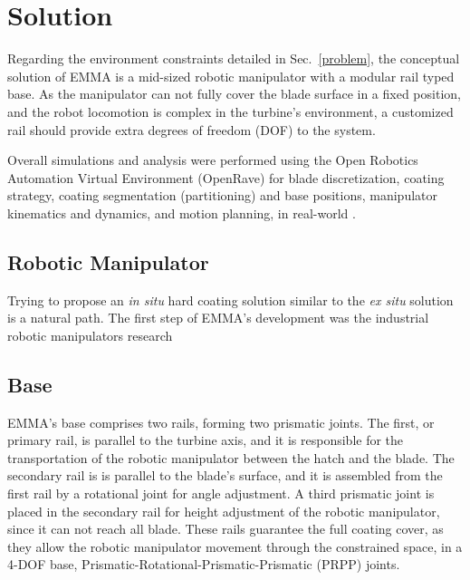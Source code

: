 \section{Solution}


Regarding the environment constraints detailed in Sec.~\ref{problem}, the
conceptual solution of EMMA is a mid-sized robotic manipulator with a modular
rail typed base. As the manipulator can not fully cover the blade surface in a
fixed position, and the robot locomotion is complex in the turbine's
environment, a customized rail should provide extra degrees of freedom (DOF) to
the system.

Overall simulations and analysis were performed using the Open Robotics
Automation Virtual Environment (OpenRave) for blade discretization, coating
strategy, coating segmentation (partitioning) and base positions, manipulator
kinematics and dynamics, and motion planning, in real-world
\cite{diankov2008openrave}. 



\subsection{Robotic Manipulator}
Trying to propose an \textit{in situ} hard coating solution similar to the
\textit{ex situ} solution is a natural path. The first step of EMMA's
development was the industrial robotic manipulators research


\subsection{Base}

EMMA's base comprises two rails, forming two prismatic joints. The
first, or primary rail, is parallel to the turbine axis, and it is responsible
for the transportation of the robotic manipulator between the hatch and the
blade. The secondary rail is is parallel to the blade's surface, and it is
assembled from the first rail by a rotational joint for angle adjustment. A
third prismatic joint is placed in the secondary rail for height adjustment of
the robotic manipulator, since it can not reach all blade. These rails guarantee
the full coating cover, as they allow the robotic manipulator movement through
the constrained space, in a 4-DOF base, Prismatic-Rotational-Prismatic-Prismatic
(PRPP) joints.

